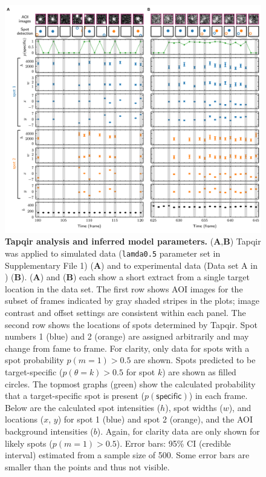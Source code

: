 \begin{figure}
\begin{fullwidth}
\includegraphics[width=183mm]{figures/tapqir_analysis.png}
\caption{\textbf{Tapqir analysis and inferred model parameters.} (\textbf{A},\textbf{B}) Tapqir was applied to simulated data (\texttt{lamda0.5} parameter set in Supplementary File 1) (\textbf{A}) and to experimental data (Data set A in ) (\textbf{B}). (\textbf{A}) and (\textbf{B}) each show a short extract from a single target location in the data set. The first row shows AOI images for the subset of frames indicated by gray shaded stripes in the plots; image contrast and offset settings are consistent within each panel. The second row shows the locations of spots determined by Tapqir. Spot numbers 1 (blue) and 2 (orange) are assigned arbitrarily and may change from fame to frame. For clarity, only data for spots with a spot probability $p(m=1) > 0.5$ are shown. Spots predicted to be target-specific ($p(\theta=k)>0.5$ for spot $k$) are shown as filled circles. The topmost graphs (green) show the calculated probability that a target-specific spot is present ($p(\mathsf{specific})$) in each frame.  Below are the calculated spot intensities ($h$), spot widths ($w$), and locations ($x$, $y$) for spot 1 (blue) and spot 2 (orange), and the AOI background intensities ($b$).  Again, for clarity data are only shown for likely spots ($p(m=1) > 0.5$). Error bars: 95\% CI (credible interval) estimated from a sample size of 500.  Some error bars are smaller than the points and thus not visible.}
\label{fig:tapqir_analysis}


\end{fullwidth}
\end{figure}
